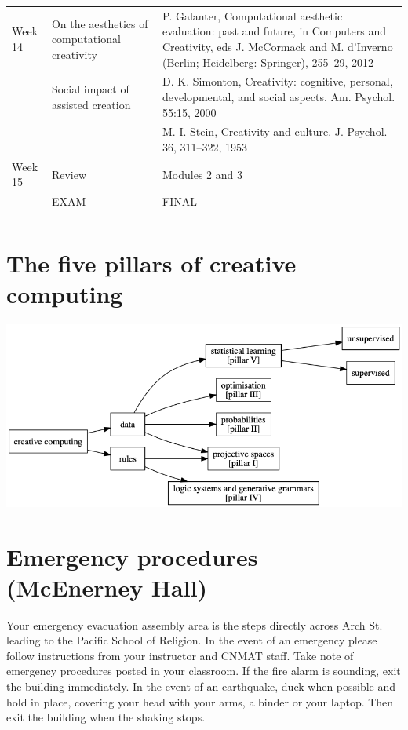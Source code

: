 \documentclass[letterpaper]{inzane_syllabus} %
\begin{document}
\begin{center}
\begin{tabularx}{\textwidth}{p{2cm}p{8cm} @{\hskip 0.5cm} p{9.5cm}}
Week 14 & On the aesthetics of computational creativity & P. Galanter, Computational aesthetic evaluation: past and future, in Computers and Creativity, eds J. McCormack and M. d’Inverno (Berlin; Heidelberg: Springer), 255–29, 2012  \\

& Social impact of assisted creation & D. K. Simonton, Creativity: cognitive, personal, developmental, and social aspects. Am. Psychol. 55:15, 2000 \\
& & M. I. Stein, Creativity and culture. J. Psychol. 36, 311–322, 1953 \\
\arrayrulecolor{maingray}\hline

Week 15 & Review & Modules 2 and 3\\

& EXAM & FINAL \\
\arrayrulecolor{myCOLOR}\hline
\hline 
\hline 
\hline 
\end{tabularx}
\end{center}


\vspace{0.5cm}
\section{The five pillars of creative computing}

\begin{center}
  \includegraphics[scale=.5]{creative_pillars.png}  
\end{center}


\vspace{0.5cm}
\section{Emergency procedures (McEnerney Hall)}

Your emergency evacuation assembly area is the steps directly across Arch St. leading to the Pacific School of Religion.
In the event of an emergency please follow instructions from your instructor and CNMAT staff.
Take note of emergency procedures posted in your classroom. If the fire alarm is sounding, exit the building immediately. In the event of an earthquake, duck when possible and hold in place, covering your head with your arms, a binder or your laptop. Then exit the building when the shaking stops.
\end{document}
